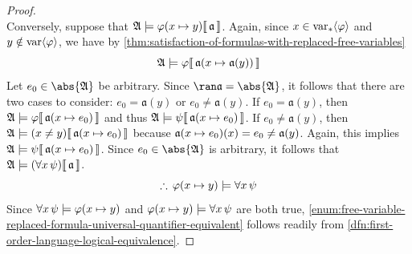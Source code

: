 \begin{proof}
\begin{equation*}
    \end{equation*}
    Conversely, suppose that \( \folwffsatisfaction{\mathfrak{A}}{ \folfreevariablereplacement{\varphi}{x}{y} }{\mathfrak{a}} \).
    Again, since \( x \in \operatorname{var}_{\ast} \langle\varphi\rangle \) and \( y \notin \operatorname{var} \langle\varphi\rangle \), we have by \cref{thm:satisfaction-of-formulas-with-replaced-free-variables}
    \begin{equation*}
        \folwffsatisfaction{\mathfrak{A}}{\varphi}{ \folmodifiedvariableassignmentfunction{\mathfrak{a}}{x}{\mathfrak{a}(y)} }
    \end{equation*}
    Let \( e_{0} \in \abs{\mathfrak{A}} \) be arbitrary. Since \( \ran \mathfrak{a} = \abs{\mathfrak{A}} \), it follows that there
    are two cases to consider: \( e_{0} = \mathfrak{a}(y) \) or \( e_{0} \neq \mathfrak{a}(y) \).
    If \( e_{0} = \mathfrak{a}(y) \), then \( \folwffsatisfaction{\mathfrak{A}}{\varphi}{ \folmodifiedvariableassignmentfunction{\mathfrak{a}}{x}{e_{0}} } \)
    and thus \( \folwffsatisfaction{\mathfrak{A}}{\psi}{ \folmodifiedvariableassignmentfunction{\mathfrak{a}}{x}{e_{0}} } \).
    If \( e_{0} \neq \mathfrak{a}(y) \), then \( \folwffsatisfaction{\mathfrak{A}}{\mleft( x \neq y \mright)}{ \folmodifiedvariableassignmentfunction{\mathfrak{a}}{x}{e_{0}} } \)
    because \( \folmodifiedvariableassignmentfunction{\mathfrak{a}}{x}{e_{0}}(x) = e_{0} \neq \mathfrak{a}(y) \).
    Again, this implies \( \folwffsatisfaction{\mathfrak{A}}{\psi}{ \folmodifiedvariableassignmentfunction{\mathfrak{a}}{x}{e_{0}} } \).
    Since \( e_{0} \in \abs{\mathfrak{A}} \) is arbitrary, it follows that \( \folwffsatisfaction{\mathfrak{A}}{\mleft( \forall x \, \psi \mright)}{\mathfrak{a}} \).
    \begin{equation*}
        \therefore \, \folfreevariablereplacement{\varphi}{x}{y} \models \forall x \, \psi
    \end{equation*}
    Since \( \forall x \, \psi \models \folfreevariablereplacement{\varphi}{x}{y} \) and \( \folfreevariablereplacement{\varphi}{x}{y} \models \forall x \, \psi \)
    are both true, \ref{enum:free-variable-replaced-formula-universal-quantifier-equivalent} follows readily from \cref{dfn:first-order-language-logical-equivalence}.


\end{proof}
